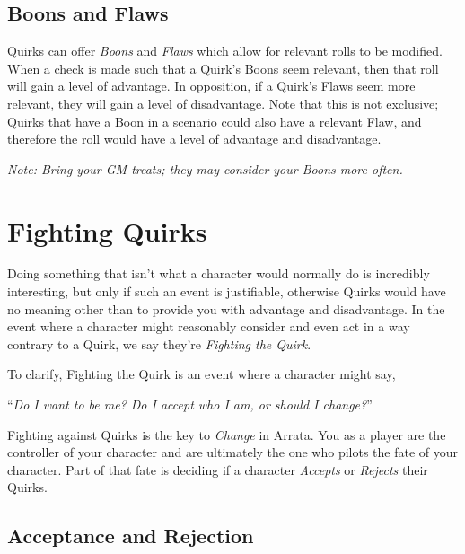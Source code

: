 \documentclass[../main.tex]{subfiles}
\begin{document}
    \subsection{Boons and Flaws}

        Quirks can offer \emph{Boons} and \emph{Flaws} which allow for relevant rolls to be modified. When a check is made such that a Quirk's Boons seem relevant, then that roll will gain a level of advantage. In opposition, if a Quirk's Flaws seem more relevant, they will gain a level of disadvantage. Note that this is not exclusive; Quirks that have a Boon in a scenario could also have a relevant Flaw, and therefore the roll would have a level of advantage and disadvantage.

        \emph{Note: Bring your GM treats; they may consider your Boons more often.}
        \begin{mdframed}[style=Arrata]
            {\em
                \lipsum[1]
            }
        \end{mdframed}

    \section{Fighting Quirks}

        Doing something that isn't what a character would normally do is incredibly interesting, but only if such an event is justifiable, otherwise Quirks would have no meaning other than to provide you with advantage and disadvantage. In the event where a character might reasonably consider and even act in a way contrary to a Quirk, we say they're \emph{Fighting the Quirk}.

        To clarify, Fighting the Quirk is an event where a character might say,
        
        \begin{center}
            ``\emph{Do I want to be me? Do I accept who I am, or should I change?}''
        \end{center}
    
        Fighting against Quirks is the key to \emph{Change} in Arrata. You as a player are the controller of your character and are ultimately the one who pilots the fate of your character. Part of that fate is deciding if a character \emph{Accepts} or \emph{Rejects} their Quirks.

    \subsection{Acceptance and Rejection}
\end{document}

